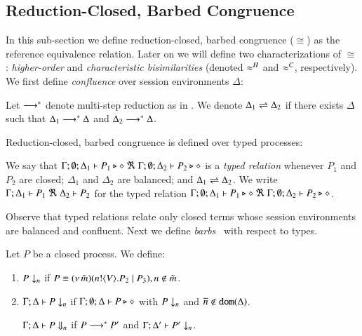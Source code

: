 
\subsection{Reduction-Closed, Barbed Congruence}
\label{subsec:rc}

\noi In this sub-section we define reduction-closed, barbed congruence ($\cong$) as the
reference equivalence relation. 
Later on we will define two characterizations of $\cong$:
\emph{higher-order} and  
\emph{characteristic bisimilarities} (denoted $\approx^H$ and $\approx^C$, respectively). 
We first define \emph{confluence} over session environments $\Delta$:

\begin{definition}
Let $\longrightarrow^\ast$ denote multi-step reduction as in .
	We denote $\Delta_1 \rightleftharpoons \Delta_2$ if there exists $\Delta$ such that
	$\Delta_1 \longrightarrow^\ast \Delta$ and $\Delta_2 \longrightarrow^\ast \Delta$.
\end{definition}

\noi Reduction-closed, barbed congruence is defined over typed
processes:

\begin{definition}
	We say that
	$\Gamma; \emptyset; \Delta_1 \vdash P_1 \triangleright \diamond\ \Re \ \Gamma; \emptyset; \Delta_2 \vdash P_2 \triangleright \diamond$
	is a {\em typed relation} whenever
	$P_1$ and $P_2$ are closed;
	$\Delta_1$ and $\Delta_2$ are balanced; and 
	$\Delta_1 \rightleftharpoons \Delta_2$.
	We write $\horel{\Gamma}{\Delta_1}{P_1}{\ \Re \ }{\Delta_2}{P_2}$
	for the typed relation $\Gamma; \emptyset; \Delta_1 \vdash P_1 \triangleright \diamond\ \Re \ \Gamma; \emptyset; \Delta_2 \vdash P_2 \triangleright \diamond$.
\end{definition}


\noi Observe that typed relations relate only closed terms whose
session environments %
are balanced  and confluent.
Next we define  {\em barbs}~\cite{MiSa92}
with respect to types. 


\begin{definition}[Barbs]\rm
	Let $P$ be a closed process. We define:
	\begin{enumerate}
		\item	$P \downarrow_{n}$ if $P \equiv (\nu\, \tilde{m})(n ! \langle V \rangle . P_2 \;|\; P_3), n \notin \tilde{m}$. %

		\item	$\Gamma; \Delta \vdash P \downarrow_{n}$ if
			$\Gamma; \emptyset; \Delta \vdash P \triangleright \diamond$ with $P \downarrow_{n}$ and $\overline{n} \notin \mathtt{dom}(\Delta)$.

			$\Gamma; \Delta \vdash P \Downarrow_{n}$ if $P \longrightarrow^* P'$ and
			$\Gamma; \Delta' \vdash P' \downarrow_{n}$.			
	\end{enumerate}
\end{definition}

